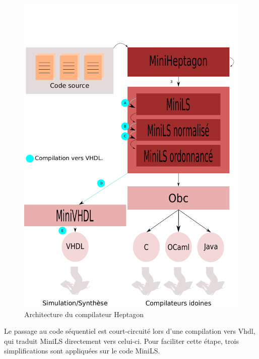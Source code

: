 \documentclass[a4paper]{article}
\newcommand{\LANG}{{\sc Heptagon}}
\newcommand{\minils}{{\sc MiniLS}}
\newcommand{\vhdl}{{\sc Vhdl}}
\begin{document}

\begin{figure}[t]
  \centering
  \includegraphics[scale=0.5]{archi}
  \caption{Architecture du compilateur \LANG}
  \label{fig:archi}
\end{figure}

Le passage au code séquentiel est court-circuité lors d'une compilation vers
\vhdl, qui traduit \minils{} directement vers celui-ci. Pour faciliter cette étape,
trois simplifications sont appliquées sur le code \minils.
\end{document}
